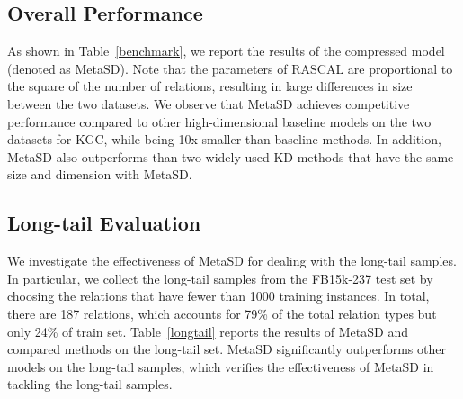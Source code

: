 \documentclass[11pt]{article}
\begin{document}
\subsection{Overall Performance}
As shown in Table~\ref{benchmark}, we report the results of the compressed model (denoted as MetaSD). Note that the parameters of RASCAL are proportional to the square of the number of relations, resulting in large differences in size between the two datasets. We observe that MetaSD achieves competitive performance compared to other high-dimensional baseline models on the two datasets for KGC, while being 10x smaller than baseline methods. 
In addition, MetaSD also outperforms than two widely used KD methods that have the same size and dimension with MetaSD.

\subsection{Long-tail Evaluation}
We investigate the effectiveness of MetaSD for dealing with the long-tail samples. In particular, we collect the long-tail samples from the FB15k-237 test set by choosing the relations that have fewer than 1000 training instances. In total, there are 187 relations, which accounts for 79\% of the total relation types but only 24\% of train set.  Table~\ref{longtail} reports the results of MetaSD and compared methods on the long-tail set. MetaSD significantly outperforms other models on the long-tail samples, which verifies the effectiveness of MetaSD in tackling the long-tail samples. 
\begin{table}
\centering
{}
\caption{\label{longtail}
Results on long-tail data from FB15k-237.
}
\end{table}
\end{document}
